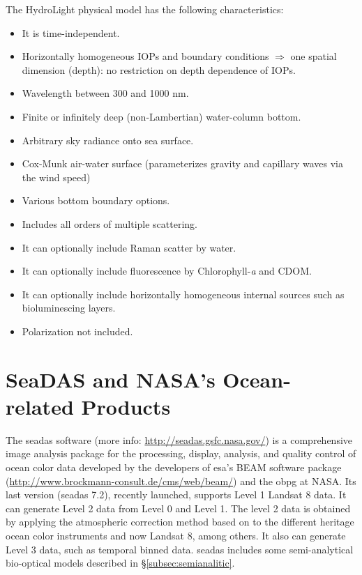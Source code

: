 The HydroLight physical model has the following characteristics:

\begin{itemize}
	\item It is time-independent.
	\item Horizontally homogeneous IOPs and boundary conditions $\Rightarrow$ one spatial dimension (depth): no restriction on depth dependence of IOPs.
	\item Wavelength between 300 and 1000 nm.
	\item Finite or infinitely deep (non-Lambertian) water-column bottom.
	\item Arbitrary sky radiance onto sea surface.
	\item Cox-Munk air-water surface (parameterizes gravity and capillary waves via the wind speed)
	\item Various bottom boundary options.
	\item Includes all orders of multiple scattering.
	\item It can optionally include Raman scatter by water.
	\item It can optionally include fluorescence by Chlorophyll-{\it a} and CDOM.
	\item It can optionally include horizontally homogeneous internal sources such as bioluminescing layers.
	\item Polarization not included.
\end{itemize}
\section{SeaDAS and NASA's Ocean-related Products}
\label{sec:seadas}

The \gls{seadas} software (more info: \url{http://seadas.gsfc.nasa.gov/}) is a comprehensive image analysis package for the processing, display, analysis, and quality control of ocean color data developed by the developers of \gls{esa}'s BEAM software package (\url{http://www.brockmann-consult.de/cms/web/beam/}) and the \gls{obpg} at NASA. Its last version (\gls{seadas} 7.2), recently launched, supports Level 1 Landsat 8 data. It can generate Level 2 data from Level 0 and Level 1. The level 2 data is obtained by applying the atmospheric correction method based on \cite{Gordon:1994} to the different heritage ocean color instruments and now Landsat 8, among others. It also can generate Level 3 data, such as temporal binned data. \gls{seadas} includes some  semi-analytical bio-optical models described in \S\ref{subsec:semianalitic}.

